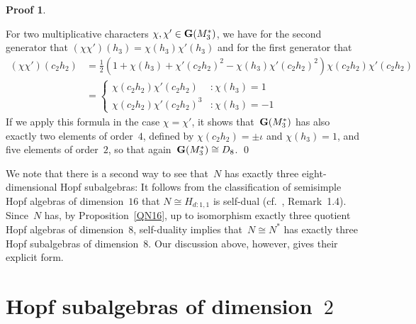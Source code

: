 \documentclass{article}
\newcounter{num}
\newenvironment{pflist}{\begin{list}{(\arabic{num})}{\usecounter{num} \leftmargin0cm \itemindent5pt}}{\end{list}}
\newcounter{num1}
\numberwithin{equation}{section}
\theoremstyle{definition}
\newtheorem*{pf}{Proof}
\theoremstyle{break}
\newcommand{\1}{{(1)}}
\newcommand{\2}{{(2)}}
\newcommand{\3}{{(3)}}
\begin{document}
\begin{pf}
\begin{pflist}
For two multiplicative characters $\chi, \chi' \in {\bf G}(M_3^*)$, we have for the second generator that
$(\chi \chi')(h_3) = \chi(h_3) \chi'(h_3)$
and for the first generator that
\begin{align*}
(\chi \chi')(c_2 h_2)
&= \frac{1}{2} \left( 1 + \chi(h_3)  + \chi'(c_2 h_2)^2 - \chi(h_3) \chi'(c_2 h_2)^2 \right)
\chi(c_2 h_2) \chi'(c_2 h_2)\\
&= \begin{cases}
\chi(c_2 h_2) \chi'(c_2 h_2) & : \chi(h_3) = 1 \\
\chi(c_2 h_2) \chi'(c_2 h_2)^3 & : \chi(h_3) = -1
\end{cases}
\end{align*}
If we apply this formula in the case $\chi = \chi'$, it shows that~${\bf G}(M_3^*)$ has also exactly two elements of order~$4$, defined by $\chi(c_2 h_2) = \pm \iota$ and $\chi(h_3) = 1$, and five elements of order~$2$, so that again~\mbox{${\bf G}(M_3^*) \cong D_8$}.
\qed
\end{pflist}
\end{pf}

We note that there is a second way to see that~$N$ has exactly three eight-dimensional Hopf subalgebras: It follows from the classification of semisimple Hopf algebras of dimension~$16$ that $N \cong H_{d:1,1}$ is self-dual (cf.~\cite{Ka}, Remark~1.4). Since~$N$ has, by Proposition~\ref{QN16}, up to isomorphism exactly three quotient Hopf algebras of dimension~$8$, self-duality implies that~$N \cong N^*$ has exactly three Hopf subalgebras of dimension~$8$. Our discussion above, however, gives their explicit form.


\section{Hopf subalgebras of dimension~$2$} \label{Sec:Dim2}
\end{document}
